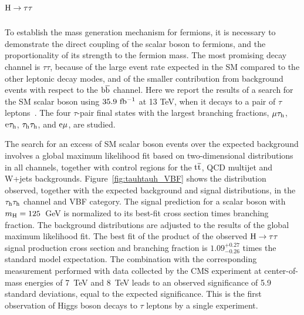 \documentclass[10pt]{article}
\begin{document}
\section{\boldmath ${\rm H}\to\tau\tau$}

To establish the mass generation mechanism for fermions, it is necessary to
demonstrate the direct coupling of the scalar boson to fermions, and the
proportionality of its strength to the fermion mass. The most promising decay
channel is $\tau\tau$, because of the large event rate expected in the SM
compared to the other leptonic decay modes, and of the smaller contribution
from background events with respect to the ${\rm b\bar{b}}$ channel. Here we
report the results of a search for the SM scalar boson using $35.9~{\rm fb^{-1}}$
at 13 TeV, when it decays to a pair of $\tau$ leptons~\cite{CMS:2017wyg}. The
four $\tau$-pair final states with the largest branching fractions,
$\mu\tau_{\rm h}$, ${\rm e}\tau_{\rm h}$, $\tau_{\rm h}\tau_{\rm h}$, and
${\rm e}\mu$, are studied.

The search for an excess of SM scalar boson events over the expected background
involves a global maximum likelihood fit based on two-dimensional distributions
in all channels, together with control regions for the ${\rm t{\bar t}}$, QCD
multijet and W+jets backgrounds. Figure~\ref{fig:tauhtauh_VBF} shows the
distribution observed, together with the expected background and signal
distributions, in the $\tau_{\rm h}\tau_{\rm h}$ channel and VBF category. The
signal prediction for a scalar boson with $m_{\rm H} = 125$~GeV is
normalized to its best-fit cross section times branching fraction. The background
distributions are adjusted to the results of the global maximum likelihood fit.
The best fit of the product of the observed ${\rm H\to\tau\tau}$ signal
production cross section and branching fraction is $1.09_{-0.26}^{+0.27}$ times
the standard model expectation. The combination with the corresponding
measurement performed with data collected by the CMS experiment at
center-of-mass energies of 7~TeV and 8~TeV leads to an observed significance of
5.9 standard deviations, equal to the expected significance. This is the first
observation of Higgs boson decays to $\tau$ leptons by a single experiment.
\end{document}
